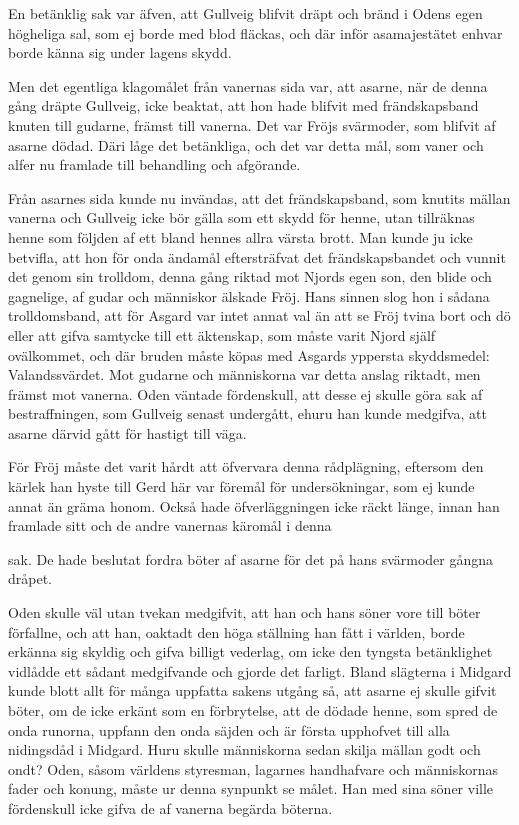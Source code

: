 En betänklig sak var äfven, att Gullveig blifvit dräpt och bränd i Odens
egen högheliga sal, som ej borde med blod fläckas, och där inför
asamajestätet enhvar borde känna sig under lagens skydd.

Men det egentliga klagomålet från vanernas sida var, att asarne, när de
denna gång dräpte Gullveig, icke beaktat, att hon hade blifvit med
frändskapsband knuten till gudarne, främst till vanerna. Det var Fröjs
svärmoder, som blifvit af asarne dödad. Däri låge det betänkliga, och
det var detta mål, som vaner och alfer nu framlade till behandling och
afgörande.

Från asarnes sida kunde nu invändas, att det frändskapsband, som knutits
mällan vanerna och Gullveig icke bör gälla som ett skydd för henne, utan
tillräknas henne som följden af ett bland hennes allra värsta brott. Man
kunde ju icke betvifla, att hon för onda ändamål eftersträfvat det
frändskapsbandet och vunnit det genom sin trolldom, denna gång riktad
mot Njords egen son, den blide och gagnelige, af gudar och människor
älskade Fröj. Hans sinnen slog hon i sådana trolldomsband, att för
Asgard var intet annat val än att se Fröj tvina bort och dö eller att
gifva samtycke till ett äktenskap, som måste varit Njord själf
ovälkommet, och där bruden måste köpas med Asgards yppersta skyddsmedel:
Valandssvärdet. Mot gudarne och människorna var detta anslag riktadt,
men främst mot vanerna. Oden väntade fördenskull, att desse ej skulle
göra sak af bestraffningen, som Gullveig senast undergått, ehuru han
kunde medgifva, att asarne därvid gått för hastigt till väga.

För Fröj måste det varit hårdt att öfvervara denna rådplägning, eftersom
den kärlek han hyste till Gerd här var föremål för undersökningar, som
ej kunde annat än gräma honom. Också hade öfverläggningen icke räckt
länge, innan han framlade sitt och de andre vanernas käromål i denna

sak. De hade beslutat fordra böter af asarne för det på hans svärmoder
gångna dråpet.

Oden skulle väl utan tvekan medgifvit, att han och hans söner vore till
böter förfallne, och att han, oaktadt den höga ställning han fått i
världen, borde erkänna sig skyldig och gifva billigt vederlag, om icke
den tyngsta betänklighet vidlådde ett sådant medgifvande och gjorde det
farligt. Bland slägterna i Midgard kunde blott allt för många uppfatta
sakens utgång så, att asarne ej skulle gifvit böter, om de icke erkänt
som en förbrytelse, att de dödade henne, som spred de onda runorna,
uppfann den onda säjden och är första upphofvet till alla nidingsdåd i
Midgard. Huru skulle människorna sedan skilja mällan godt och ondt?
Oden, såsom världens styresman, lagarnes handhafvare och människornas
fader och konung, måste ur denna synpunkt se målet. Han med sina söner
ville fördenskull icke gifva de af vanerna begärda böterna.

